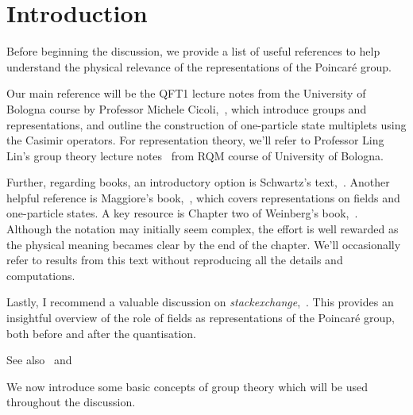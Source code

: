 \section{Introduction}
Before beginning the discussion, we provide a list of useful references to help understand the physical relevance of the representations of the Poincaré group. 

Our main reference will be the QFT1 lecture notes from the University of Bologna course by Professor Michele Cicoli,~\cite{cicoli}, which introduce groups and representations, and outline the construction of one-particle state multiplets using the Casimir operators. For representation theory, we'll refer to Professor Ling Lin's group theory lecture notes~\cite{ling} from RQM course of University of Bologna.

Further, regarding books, an introductory option is Schwartz's text,~\cite{schwartz}. Another helpful reference is Maggiore's book,~\cite{maggiore}, which covers representations on fields and one-particle states. A key resource is Chapter two of Weinberg's book,~\cite{weinberg}. Although the notation may initially seem complex, the effort is well rewarded as the physical meaning becames clear by the end of the chapter. We'll occasionally refer to results from this text without reproducing all the details and computations.

Lastly, I recommend a valuable discussion on \emph{stackexchange},~\cite{stackexchange}. This provides an insightful overview of the role of fields as representations of the Poincaré group, both before and after the quantisation.

See also~\cite{temp1} and~\cite{temp2}

We now introduce some basic concepts of group theory which will be used throughout the discussion.